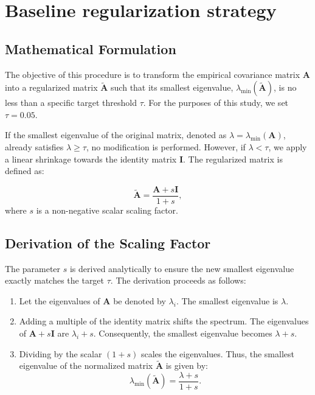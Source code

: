 \documentclass[a4paper,11pt,twoside]{report}
\theoremstyle{definition}
\begin{document}
\chapter{Baseline regularization strategy}
\label{ch:baseline_regularization}

\section{Mathematical Formulation}

The objective of this procedure is to transform the empirical covariance matrix $\mathbf{A}$ into a regularized matrix $\tilde{\mathbf{A}}$ such that its smallest eigenvalue, $\lambda_{\min}(\tilde{\mathbf{A}})$, is no less than a specific target threshold $\tau$. For the purposes of this study, we set $\tau = 0.05$.

If the smallest eigenvalue of the original matrix, denoted as $\lambda = \lambda_{\min}(\mathbf{A})$, already satisfies $\lambda \ge \tau$, no modification is performed. However, if $\lambda < \tau$, we apply a linear shrinkage towards the identity matrix $\mathbf{I}$. The regularized matrix is defined as:

\begin{equation}
    \tilde{\mathbf{A}} = \frac{\mathbf{A} + s\mathbf{I}}{1 + s},
\end{equation}
where $s$ is a non-negative scalar scaling factor.

\section{Derivation of the Scaling Factor}

The parameter $s$ is derived analytically to ensure the new smallest eigenvalue exactly matches the target $\tau$. The derivation proceeds as follows:

\begin{enumerate}
    \item Let the eigenvalues of $\mathbf{A}$ be denoted by $\lambda_i$. The smallest eigenvalue is $\lambda$.
    \item Adding a multiple of the identity matrix shifts the spectrum. The eigenvalues of $\mathbf{A} + s\mathbf{I}$ are $\lambda_i + s$. Consequently, the smallest eigenvalue becomes $\lambda + s$.
    \item Dividing by the scalar $(1+s)$ scales the eigenvalues. Thus, the smallest eigenvalue of the normalized matrix $\tilde{\mathbf{A}}$ is given by:
    \begin{equation}
        \lambda_{\min}(\tilde{\mathbf{A}}) = \frac{\lambda + s}{1 + s}.
    \end{equation}
\end{enumerate}
\end{document}
